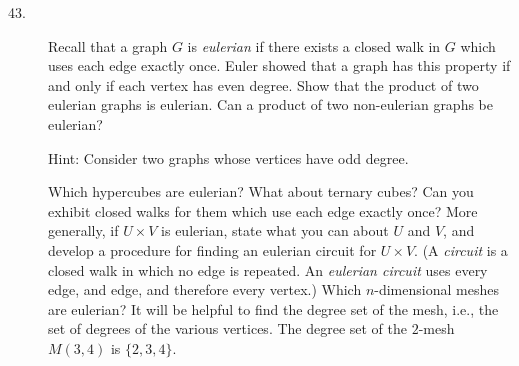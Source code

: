 \documentclass{article}
\begin{document}
\begin{description}
\item[43.] Recall that a graph $G$ is \emph{eulerian} if there exists a closed walk in $G$ which uses each edge exactly once. Euler showed that a graph has this property if and only if each vertex has even degree. Show that the product of two eulerian graphs is eulerian. Can a product of two non-eulerian graphs be eulerian?

  Hint: Consider two graphs whose vertices have odd degree.

  Which hypercubes are eulerian? What about ternary cubes? Can you exhibit closed walks for them which use each edge exactly once? More generally, if $U \times V$ is eulerian, state what you can about $U$ and $V$, and develop a procedure for finding an eulerian circuit for $U \times V$. (A \emph{circuit} is a closed walk in which no edge is repeated. An \emph{eulerian circuit} uses every edge, and edge, and therefore every vertex.) Which $n$-dimensional meshes are eulerian? It will be helpful to find the degree set of the mesh, i.e., the set of degrees of the various vertices. The degree set of the $2$-mesh $M(3,4)$ is $\{ 2,3,4 \}$.

\end{description}
\end{document}
